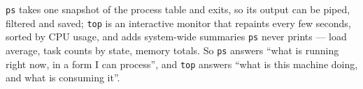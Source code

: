 
\texttt{ps} takes one snapshot of the process table and exits, so its output can
be piped, filtered and saved; \texttt{top} is an interactive monitor that
repaints every few seconds, sorted by CPU usage, and adds system-wide summaries
\texttt{ps} never prints --- load average, task counts by state, memory totals.
So \texttt{ps} answers ``what is running right now, in a form I can process'',
and \texttt{top} answers ``what is this machine doing, and what is consuming
it''.
